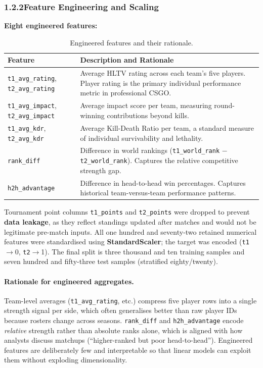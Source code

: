 \documentclass[12pt,a4paper]{article}
\begin{document}
\newpage
\subsubsection{1.2.2\quad Feature Engineering and Scaling}

\textbf{Eight engineered features:}

\begin{table}[H]
\centering
\caption{Engineered features and their rationale.}
\begin{tabularx}{\textwidth}{lX}
\toprule
\textbf{Feature} & \textbf{Description and Rationale} \\
\midrule
\texttt{t1\_avg\_rating}, \texttt{t2\_avg\_rating} & Average HLTV rating across each team's five players. Player rating is the primary individual performance metric in professional CSGO. \\
\texttt{t1\_avg\_impact}, \texttt{t2\_avg\_impact} & Average impact score per team, measuring round-winning contributions beyond kills. \\
\texttt{t1\_avg\_kdr}, \texttt{t2\_avg\_kdr} & Average Kill-Death Ratio per team, a standard measure of individual survivability and lethality. \\
\texttt{rank\_diff} & Difference in world rankings (\texttt{t1\_world\_rank} $-$ \texttt{t2\_world\_rank}). Captures the relative competitive strength gap. \\
\texttt{h2h\_advantage} & Difference in head-to-head win percentages. Captures historical team-versus-team performance patterns. \\
\bottomrule
\end{tabularx}
\end{table}

Tournament point columns \texttt{t1\_points} and \texttt{t2\_points} were dropped to prevent \textbf{data leakage}, as they reflect standings updated after matches and would not be legitimate pre-match inputs. All one hundred and seventy-two retained numerical features were standardised using \textbf{StandardScaler}; the target was encoded (\texttt{t1}$\rightarrow$0, \texttt{t2}$\rightarrow$1). The final split is three thousand and ten training samples and seven hundred and fifty-three test samples (stratified eighty/twenty).

\paragraph{Rationale for engineered aggregates.}
Team-level averages (\texttt{t1\_avg\_rating}, etc.) compress five player rows into a single strength signal per side, which often generalises better than raw player IDs because rosters change across seasons. \texttt{rank\_diff} and \texttt{h2h\_advantage} encode \textit{relative} strength rather than absolute ranks alone, which is aligned with how analysts discuss matchups (``higher-ranked but poor head-to-head''). Engineered features are deliberately few and interpretable so that linear models can exploit them without exploding dimensionality.
\end{document}
